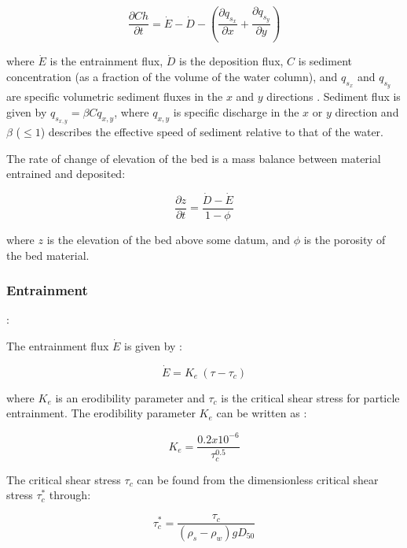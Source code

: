 \documentclass[10pt]{article}
\begin{document}
\begin{equation}
\frac{\partial C h}{\partial t} = \dot{E} - \dot{D} - \left(\frac{\partial q_{s_x}}{\partial x} + \frac{\partial q_{s_y}}{\partial y} \right)
\end{equation}

\noindent where $\dot{E}$ is the entrainment flux, $\dot{D}$ is the deposition flux, $C$ is sediment concentration (as a fraction of the volume of the water column), and $q_{s_x}$ and $q_{s_y}$ are specific volumetric sediment fluxes in the $x$ and $y$ directions \citep[e.g.,][]{davy2009fluvial}. Sediment flux is given by $q_{s_{x,y}} = \beta C q_{x,y}$, where $q_{x,y}$ is specific discharge in the $x$ or $y$ direction and $\beta$ ($\le 1$) describes the effective speed of sediment relative to that of the water.

The rate of change of elevation of the bed is a mass balance between material entrained and deposited:

\begin{equation}
\frac{\partial z}{\partial t} = \frac{\dot{D} - \dot{E}}{1 - \phi}
\end{equation}

\noindent where $z$ is the elevation of the bed above some datum, and $\phi$ is the porosity of the bed material.

\subsubsection{Entrainment}:

The entrainment flux $\dot{E}$ is given by \citep[e.g.,][]{hanson1990surface}:

\begin{equation}
\dot{E} = K_e \: (\tau - {\tau_c})
\end{equation}

\noindent where $K_e$ is an erodibility parameter and ${\tau_c}$ is the critical shear stress for particle entrainment. The erodibility parameter $K_e$ can be written as \citep{hanson2001erodibility}:
 
\begin{equation}
K_e = \frac{0.2 x 10^{-6}}{\tau_c^{0.5}}
\end{equation}

The critical shear stress ${\tau_c}$ can be found from the dimensionless critical shear stress ${\tau^*_c}$ through:

\begin{equation}
\tau^*_c = \frac{\tau_c}{(\rho_s - \rho_w) g D_{50}}
\end{equation}
\end{document}
